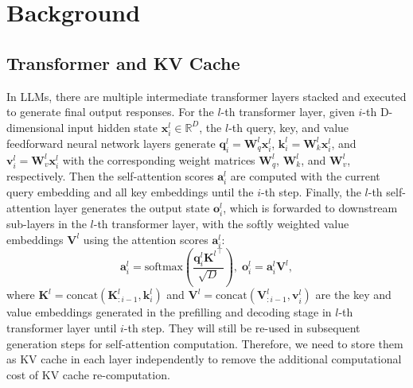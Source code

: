 \section{Background}
\subsection{Transformer and KV Cache}
In LLMs, there are multiple intermediate transformer layers stacked and executed to generate final output responses. For the $l$-th transformer layer, given $i$-th D-dimensional input hidden state $\boldsymbol{x}_i^l \in \mathbb{R}^{D}$, the $l$-th query, key, and value feedforward neural network layers generate $\boldsymbol{q}_i^l = \boldsymbol{W}_q^l \boldsymbol{x}_i^l$, $\boldsymbol{k}_i^l = \boldsymbol{W}_k^l \boldsymbol{x}_i^l$, and $\boldsymbol{v}_i^l = \boldsymbol{W}_v^l \boldsymbol{x}_i^l$ with the corresponding weight matrices $\boldsymbol{W}_q^l$, $\boldsymbol{W}_k^l$, and $\boldsymbol{W}_v^l$, respectively. Then the self-attention scores $\boldsymbol{a}_i^l$ are computed with the current query embedding and all key embeddings until the $i$-th step. Finally, the $l$-th self-attention layer generates the output state $\boldsymbol{o}_i^l$, which is forwarded to downstream sub-layers in the $l$-th transformer layer, with the softly weighted value embeddings $\boldsymbol{V}^l$ using the attention scores $\boldsymbol{a}_i^l$:
\begin{equation}\label{eq:attention_score}
\boldsymbol{a}_i^l = \mbox{softmax}\left(\frac{\boldsymbol{q}_i^l {\boldsymbol{K}^l}^\top}{\sqrt{D}}\right), \; \boldsymbol{o}_i^l =  \boldsymbol{a}_i^l \boldsymbol{V}^l, 
\end{equation}
where $\boldsymbol{K}^l \!\!=\!\! \text{concat}(\boldsymbol{K}_{:i-1}^l, \boldsymbol{k}_{i}^l)$ and  $\boldsymbol{V}^l \!\!=\!\! \text{concat}(\boldsymbol{V}_{:i-1}^l, \boldsymbol{v}_{i}^l)$ are the key and value embeddings generated in the prefilling and decoding stage in $l$-th transformer layer until $i$-th step. They will still be re-used in subsequent generation steps for self-attention computation. Therefore, we need to store them as KV cache in each layer independently to remove the additional computational cost of KV cache re-computation.

